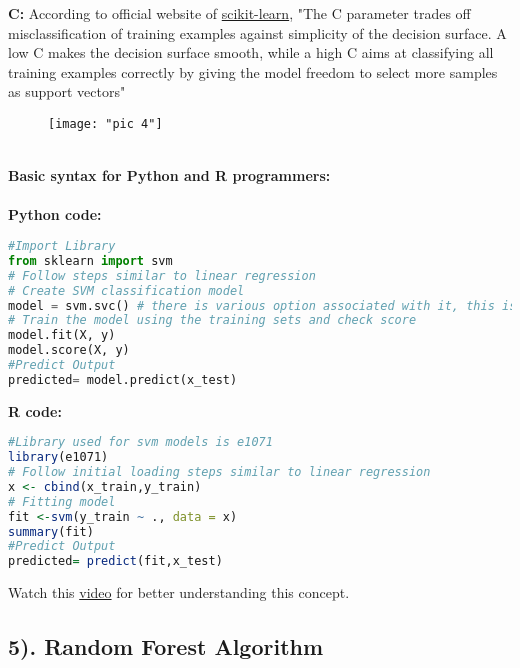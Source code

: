 \documentclass[Proceedings]{ascelike}
\begin{document}
\textbf{C:} According to official website of \href{http://scikit-learn.org/stable/auto_examples/svm/plot_rbf_parameters.html}{scikit-learn}, "The C parameter trades off misclassification of training examples against simplicity of the decision surface. A low C makes the decision surface smooth, while a high C aims at classifying all training examples correctly by giving the model freedom to select more samples as support vectors"

\begin{figure}[!ht]
	\centering
	\texttt{[image: "pic 4"]}
	\caption{}
	\label{fig:pic-4}
\end{figure}\\
\newpage
\textbf{Basic syntax for Python and R programmers:}\\
\\\textbf{Python code:}
\begin{lstlisting}[language=Python]
#Import Library
from sklearn import svm
# Follow steps similar to linear regression
# Create SVM classification model
model = svm.svc() # there is various option associated with it, this is simple for classification. 
# Train the model using the training sets and check score
model.fit(X, y)
model.score(X, y)
#Predict Output
predicted= model.predict(x_test)
\end{lstlisting}

\textbf{R code:}
\begin{lstlisting}[language=R]
#Library used for svm models is e1071
library(e1071)
# Follow initial loading steps similar to linear regression
x <- cbind(x_train,y_train)
# Fitting model
fit <-svm(y_train ~ ., data = x)
summary(fit)
#Predict Output 
predicted= predict(fit,x_test)
\end{lstlisting}

Watch this \href{https://www.youtube.com/watch?v=pS5gXENd3a4}{video} for better understanding this concept.

\subsection{5). Random Forest Algorithm}
\end{document}
